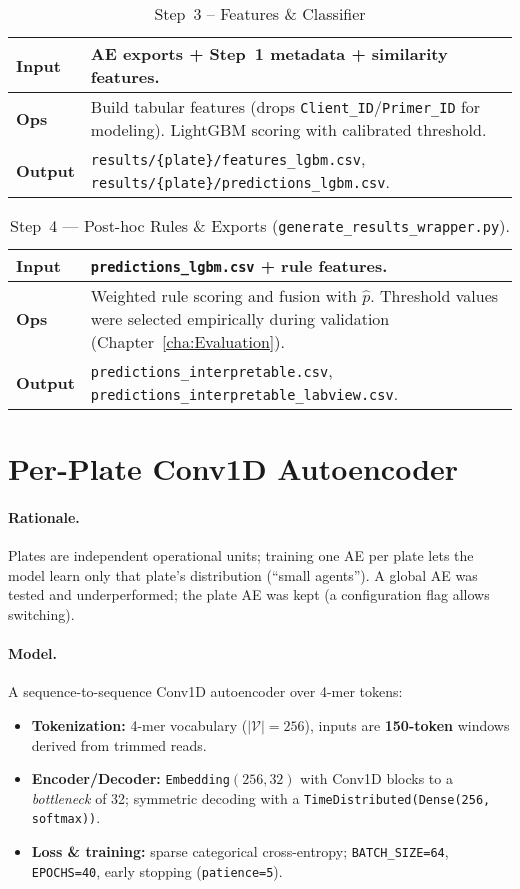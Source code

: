\begin{table}[H]\centering
\caption{Step~3 -- Features \& Classifier}
\begin{tabular}{|p{3.8cm}|p{9.8cm}|}\hline
\textbf{Input} & AE exports + Step~1 metadata + similarity features. \\ \hline
\textbf{Ops} & Build tabular features (drops \texttt{Client\_ID}/\texttt{Primer\_ID} for modeling). LightGBM scoring with calibrated threshold. \\ \hline
\textbf{Output} & \texttt{results/\{plate\}/features\_lgbm.csv}, \texttt{results/\{plate\}/predictions\_lgbm.csv}. \\ \hline
\end{tabular}
\end{table}

\begin{table}[H]\centering
\caption{Step~4 — Post-hoc Rules \& Exports (\texttt{generate\_results\_wrapper.py}).}
\begin{tabular}{|p{3.8cm}|p{9.8cm}|}\hline
\textbf{Input} & \texttt{predictions\_lgbm.csv} + rule features. \\ \hline
\textbf{Ops} & Weighted rule scoring and fusion with $\hat p$. Threshold values were selected empirically during validation (Chapter~\ref{cha:Evaluation}). \\ \hline
\textbf{Output} & \texttt{predictions\_interpretable.csv}, \texttt{predictions\_interpretable\_labview.csv}. \\ \hline
\end{tabular}
\end{table}

\section{Per-Plate Conv1D Autoencoder}
\label{sec:ae}

\paragraph{Rationale.} Plates are independent operational units; training one AE per plate lets the model learn only that plate’s distribution (``small agents''). A global AE was tested and underperformed; the plate AE was kept (a configuration flag allows switching).

\paragraph{Model.} A sequence-to-sequence Conv1D autoencoder over 4-mer tokens:
\begin{itemize}
  \item \textbf{Tokenization:} 4-mer vocabulary ($|\mathcal{V}|=256$), inputs are \textbf{150-token} windows derived from trimmed reads.
  \item \textbf{Encoder/Decoder:} \texttt{Embedding}$(256,32)$ with Conv1D blocks to a \emph{bottleneck} of 32; symmetric decoding with a \texttt{TimeDistributed(Dense(256, softmax))}.
  \item \textbf{Loss \& training:} sparse categorical cross-entropy; \texttt{BATCH\_SIZE=64}, \texttt{EPOCHS=40}, early stopping (\texttt{patience=5}).
\end{itemize}

